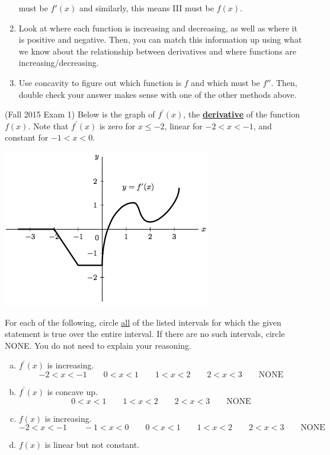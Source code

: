 \documentclass[11pt]{exam}
\begin{document}
\begin{questions}
\begin{solution}
\begin{enumerate}
      must be \(f'(x)\) and similarly, this means III must be
      \(f(x)\).
    \item Look at where each function is increasing and decreasing, as
      well as where it is positive and negative. Then, you can match
      this information up using what we know about the relationship
      between derivatives and where functions are
      increasing/decreasing.
    \item Use concavity to figure out which function is \(f\) and
      which must be \(f''\). Then, double check your answer makes
      sense with one of the other methods above.
    \end{enumerate}
  \end{solution}
\question (Fall 2015 Exam 1) Below is the graph of $f^\prime(x)$, the \underline{\textbf{derivative}} of the function $f(x)$. Note that $f^\prime(x)$ is zero for $x \leqslant -2$, linear for $-2 < x < -1$, and constant for $-1 <x < 0$.
  \begin{center}
    \includegraphics[scale=0.7]{Figures/graph_exam_problem.png}
  \end{center}
For each of the following, circle \underline{all} of the listed intervals for which the given statement is true over the entire interval. If there are no such intervals, circle NONE. You do not need to explain your reasoning.
\begin{enumerate}[(a)]
	\item $f^\prime(x)$ is increasing.
\[-2 < x < -1 \qquad 0 < x < 1 \qquad 1 < x < 2 \qquad 2 < x < 3 \qquad \text{NONE}\]
	\item $f^\prime(x)$ is concave up.
\[0<x<1 \qquad 1<x<2 \qquad 2<x<3 \qquad \text{NONE}\]
	\item $f(x)$ is increasing.
\[-2 < x < -1 \qquad -1 < x < 0 \qquad 0 < x < 1 \qquad 1 < x < 2 \qquad 2 < x < 3 \qquad \text{NONE}\]
	\item $f(x)$ is linear but not constant.

\end{enumerate}
\end{questions}
\end{document}
